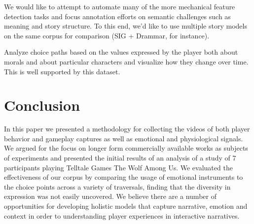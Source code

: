 We would like to attempt to automate many of the more mechanical
feature detection tasks and focus annotation efforts on semantic
challenges such as meaning and story structure. To this end, we’d like
to use multiple story models on the same corpus for comparison (SIG +
Drammar, for instance).

Analyze choice paths based on the values expressed by the player both
about morals and about particular characters and visualize how they
change over time. This is well supported by this dataset.
\section{Conclusion}
\label{sec:orgheadline13}
In this paper we presented a methodology for collecting the videos of
both player behavior and gameplay captures as well as emotional and
physiological signals. We argued for the focus on longer form
commercially available works as subjects of experiments and presented
the initial results of an analysis of a study of 7 participants
playing Telltale Games The Wolf Among Us. We evaluated the
effectiveness of our corpus by comparing the usage of emotional
instruments to the choice points across a variety of traversals,
finding that the diversity in expression was not easily uncovered. We
believe there are a number of opportunities for developing holistic
models that capture narrative, emotion and context in order to
understanding player experiences in interactive narratives.
